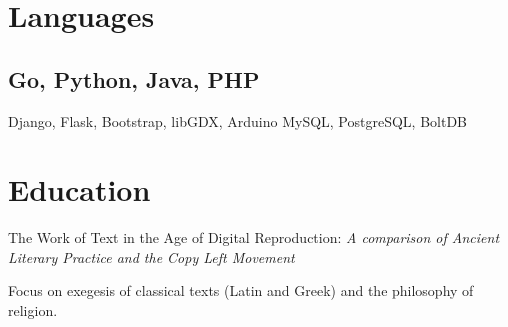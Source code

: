 \documentclass[]{deedy-resume-openfont}
\begin{document}
\section{Languages}
\subsection{Go, Python, Java, PHP} 
Django, Flask, Bootstrap, libGDX, Arduino \textbullet{} MySQL, PostgreSQL, BoltDB
\sectionsep


\section{Education}
The Work of Text in the Age of Digital Reproduction:
\textit{A comparison of Ancient Literary Practice and the Copy Left Movement}

Focus on exegesis of classical texts (Latin and Greek) and the philosophy of religion.
\sectionsep
\end{document}

